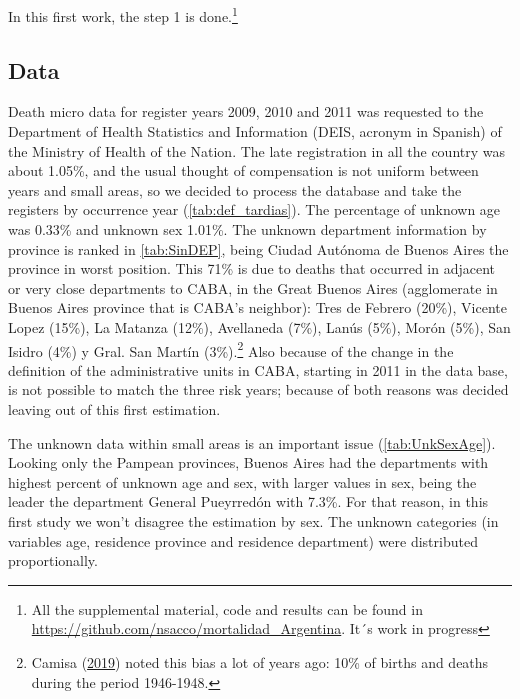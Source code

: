 \documentclass[12pt,]{article}
\begin{document}
In this first work, the step 1 is done.\footnote{All the supplemental
  material, code and results can be found in
  \url{https://github.com/nsacco/mortalidad_Argentina}. It´s work in
  progress}

\hypertarget{data}{%
\subsection{\texorpdfstring{\textbf{Data}}{Data}}\label{data}}

Death micro data for register years 2009, 2010 and 2011 was requested to
the Department of Health Statistics and Information (DEIS, acronym in
Spanish) of the Ministry of Health of the Nation. The late registration
in all the country was about 1.05\%, and the usual thought of
compensation is not uniform between years and small areas, so we decided
to process the database and take the registers by occurrence year
(\ref{tab:def_tardias}). The percentage of unknown age was 0.33\% and
unknown sex 1.01\%. The unknown department information by province is
ranked in \ref{tab:SinDEP}, being Ciudad Autónoma de Buenos Aires the
province in worst position. This 71\% is due to deaths that occurred in
adjacent or very close departments to CABA, in the Great Buenos Aires
(agglomerate in Buenos Aires province that is CABA's neighbor): Tres de
Febrero (20\%), Vicente Lopez (15\%), La Matanza (12\%), Avellaneda
(7\%), Lanús (5\%), Morón (5\%), San Isidro (4\%) y Gral. San Martín
(3\%).\footnote{Camisa (\protect\hyperlink{ref-Camisa_2019}{2019}) noted
  this bias a lot of years ago: 10\% of births and deaths during the
  period 1946-1948.} Also because of the change in the definition of the
administrative units in CABA, starting in 2011 in the data base, is not
possible to match the three risk years; because of both reasons was
decided leaving out of this first estimation.

The unknown data within small areas is an important issue
(\ref{tab:UnkSexAge}). Looking only the Pampean provinces, Buenos Aires
had the departments with highest percent of unknown age and sex, with
larger values in sex, being the leader the department General Pueyrredón
with 7.3\%. For that reason, in this first study we won't disagree the
estimation by sex. The unknown categories (in variables age, residence
province and residence department) were distributed proportionally.
\end{document}
